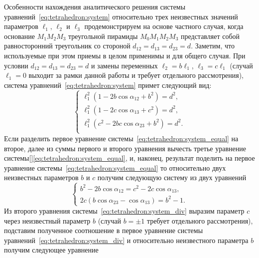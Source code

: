 \documentclass[../main.tex]{subfiles}
\begin{document}
Особенности нахождения аналитического решения системы уравнений~\eqref{eq:tetrahedron:system} относительно трех неизвестных значений параметров $\ell_1$, $\ell_2$ и $\ell_3$ продемонстрируем на основе частного случая, когда основание $M_1 M_2 M_3$ треугольной пирамиды $M_0 M_1 M_2 M_3$ представляет собой равносторонний треугольник со стороной $d_{12} = d_{13} = d_{23} = d$. Заметим, что используемые при этом приемы в целом применимы и для общего случая. При условии $d_{12} = d_{13} = d_{23} = d$ и замены переменных $\ell_2 = b \ell_1$, $\ell_3 = c \ell_1$ (случай $\ell_1 = 0$ выходит за рамки данной работы и требует отдельного рассмотрения), система уравнений~\eqref{eq:tetrahedron:system} примет следующий вид:
\begin{equation}\label{eq:tetrahedron:system_equal}
  \begin{cases}
    \ell_1^2 \left(1 - 2b\cos\alpha_{12} + b^2\right) = d^2, \\
    \ell_1^2 \left(1 - 2c\cos\alpha_{13} + c^2\right) = d^2, \\
    \ell_1^2 \left(c^2 - 2bc\cos\alpha_{23} + b^2\right) = d^2. \\
  \end{cases}
\end{equation}
Если разделить первое уравнение системы~\eqref{eq:tetrahedron:system_equal} на второе, далее из суммы первого и второго уравнения вычесть третье уравнение системы[]\eqref{eq:tetrahedron:system_equal}, и, наконец, результат поделить на первое уравнение системы~\eqref{eq:tetrahedron:system_equal} то относительно двух неизвестных параметров $b$ и $c$ получим следующую систему из двух уравнений
\begin{equation}\label{eq:tetrahedron:system_div}
  \begin{cases}
    b^2- 2b\cos\alpha_{12} = c^2 - 2c\cos\alpha_{13}, \\
    2c \left(b\cos\alpha_{23} - \cos\alpha_{13}\right) = b^2 - 1.
  \end{cases}
\end{equation}
Из второго уравнения системы~\eqref{eq:tetrahedron:system_div} выразим параметр $c$ через неизвестный параметр $b$ (случай $b = \pm 1$ требует отдельного рассмотрения), подставим полученное соотношение в первое уравнение системы уравнений~\eqref{eq:tetrahedron:system_div} и относительно неизвестного параметра $b$ получим следующее уравнение
\end{document}
